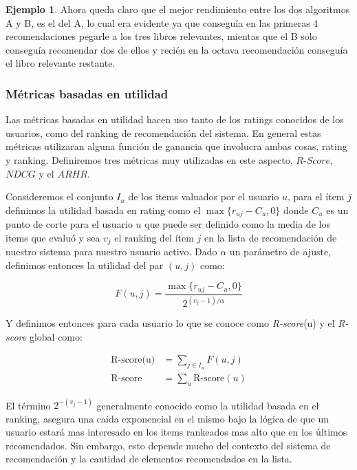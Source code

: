 \documentclass[hidelinks,12pt,a4paper]{book}
\theoremstyle{plain}
\theoremstyle{definition}
\newtheorem{ejemplo}{{\textbf{Ejemplo}}}[chapter]
\begin{document}
\begin{ejemplo}
Ahora queda claro que el mejor rendimiento entre los dos algoritmos A y B, es el del A, lo cual era evidente ya que conseguía en las primeras 4 recomendaciones pegarle a los tres libros relevantes, mientas que el B solo conseguía recomendar dos de ellos y recién en la octava recomendación conseguía el libro relevante restante.  

\end{ejemplo}

\subsubsection{Métricas basadas en utilidad}

Las métricas basadas en utilidad hacen uso tanto de los ratings conocidos de los usuarios, como del ranking de recomendación del sistema. En general estas métricas utilizaran alguna función de ganancia que involucra ambas cosas, rating y ranking. Definiremos tres métricas muy utilizadas en este aspecto, $R$-$Score$, $NDCG$ y el $ARHR$.

Consideremos el conjunto $I_u$ de los items valuados por el usuario $u$, para el ítem $j$ definimos la utilidad basada en rating como el $\max\{r_{uj}-C_u,0\}$ donde $C_u$ es un punto de corte para el usuario $u$ que puede ser definido como la media de los items que evaluó y sea $v_j$ el ranking del ítem $j$ en la lista de recomendación de nuestro sistema para nuestro usuario activo. Dado $\alpha$ un parámetro de ajuste, definimos entonces la utilidad del par $(u,j)$ como:

\begin{equation}
F(u,j) = \frac{\max\{r_{uj}-C_u,0\}}{2^{{(v_j-1)}/\alpha}}
\end{equation}

Y definimos entonces para cada usuario lo que se conoce como \textit{R-score}(u) y el \textit{R-score} global como:

\begin{align}
\text{R-score(u)} &= \sum_{j \in I_u} F(u,j)\\
\text{R-score} &= \sum_{u} \text{R-score}(u)
\end{align}

El término $2^{-{(v_j-1)}}$ generalmente conocido como la utilidad basada en el ranking, asegura una caída exponencial en el mismo bajo la lógica de que un usuario estará mas interesado en los items rankeados mas alto que en los últimos recomendados. Sin embargo, esto depende mucho del contexto del sistema de recomendación y la cantidad de elementos recomendados en la lista.
\end{document}
